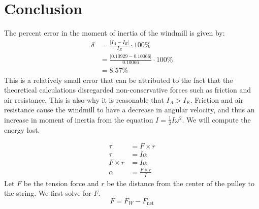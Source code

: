 \documentclass[article, 11pt]{article}
\newcommand{\df}{\displaystyle\frac} %
\begin{document}
    \section{Conclusion}
    \noindent
    The percent error in the moment of inertia of the windmill is given by:
    \begin{align*}
        \delta &= \frac{|I_A - I_E|}{I_E} \cdot 100\% \\
               &= \frac{|0.10929 - 0.10066|}{0.10066} \cdot 100\% \\
               &= 8.57\%
    \end{align*}
    This is a relatively small error that can be attributed to the fact that the theoretical calculations disregarded non-conservative forces such as friction and air resistance. This is also why it is reasonable that $I_A > I_E$. Friction and air resistance cause the windmill to have a decrease in angular velocity, and thus an increase in moment of inertia from the equation $I = \df{1}{2}I\omega^2$. We will compute the energy lost.
    \begin{comment}
    \begin{align*}
        E_E                      &= E_A + W_\text{lost} \\
        \frac{1}{2}I_E\omega_E^2 &= \frac{1}{2}I_A\omega_A^2 + W_\text{lost} 
    \end{align*}
    We first compute $\omega_E$, the angular velocity of the expected angular velocity:
    \begin{align*}
        mgh      &= \frac{1}{2}I_E\omega_E^2 \\
        \omega_E &= \sqrt{\frac{2mgh}{I_E}} \\
                 &= \sqrt{\frac{2(0.1)(9.81)(0.77)}{0.10066}} \\
                 &\approx \SI{3.8741}{\frac{\radian}{\second}}
    \end{align*}
    \end{comment}
    \begin{align*}
        \tau &= F \times r \\
        \tau &= I \alpha \\
        F \times r &= I \alpha \\
        \alpha &= \frac{F \times r}{I}
    \end{align*}
    Let $F$ be the tension force and $r$ be the distance from the center of the pulley to the string. We first solve for $F$.
    \begin{equation*}
        F = F_W - F_\text{net}
    \end{equation*}
\end{document}
